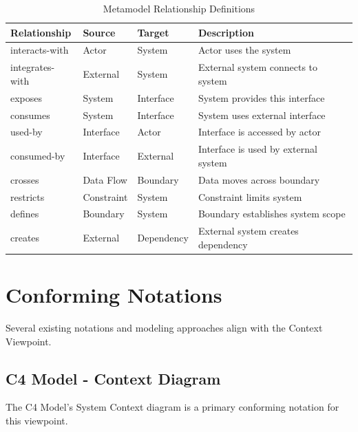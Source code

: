 \documentclass[11pt,letterpaper]{article}
\begin{document}
\begin{table}[H]
\centering
\caption{Metamodel Relationship Definitions}
\small
\begin{tabular}{@{}L{2.3cm}L{2.3cm}L{2.3cm}L{\dimexpr\linewidth-6.9cm-6\tabcolsep\relax}@{}}
\toprule
\textbf{Relationship} & \textbf{Source} & \textbf{Target} & \textbf{Description} \\
\midrule
interacts-with & Actor & System & Actor uses the system \\
\addlinespace
integrates-with & External & System & External system connects to system \\
\addlinespace
exposes & System & Interface & System provides this interface \\
\addlinespace
consumes & System & Interface & System uses external interface \\
\addlinespace
used-by & Interface & Actor & Interface is accessed by actor \\
\addlinespace
consumed-by & Interface & External & Interface is used by external system \\
\addlinespace
crosses & Data Flow & Boundary & Data moves across boundary \\
\addlinespace
restricts & Constraint & System & Constraint limits system \\
\addlinespace
defines & Boundary & System & Boundary establishes system scope \\
\addlinespace
creates & External & Dependency & External system creates dependency \\
\bottomrule
\end{tabular}
\end{table}

\section{Conforming Notations}

Several existing notations and modeling approaches align with the Context Viewpoint.

\subsection{C4 Model - Context Diagram}

The C4 Model's System Context diagram is a primary conforming notation for this viewpoint.
\end{document}
